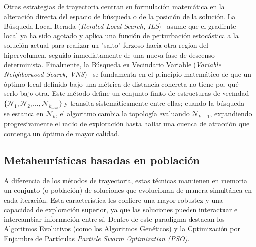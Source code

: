 \documentclass[12pt,a4paper,twoside,openright]{book}
\begin{document}
    Otras estrategias de trayectoria centran su formulación matemática en la alteración directa del espacio de búsqueda o de la posición de la solución. La Búsqueda Local Iterada (\textit{Iterated Local Search, ILS})~\cite{lourenco2003iterated} asume que el gradiente local ya ha sido agotado y aplica una función de perturbación estocástica a la solución actual para realizar un "salto" forzoso hacia otra región del hipervolumen, seguido inmediatamente de una nueva fase de descenso determinista. Finalmente, la Búsqueda en Vecindario Variable (\textit{Variable Neighborhood Search, VNS})~\cite{hansen2001variable} se fundamenta en el principio matemático de que un óptimo local definido bajo una métrica de distancia concreta no tiene por qué serlo bajo otra. Este método define un conjunto finito de estructuras de vecindad $\{\mathcal{N}_1, \mathcal{N}_2, \dots, \mathcal{N}_{k_{max}}\}$ y transita sistemáticamente entre ellas; cuando la búsqueda se estanca en $\mathcal{N}_k$, el algoritmo cambia la topología evaluando $\mathcal{N}_{k+1}$, expandiendo progresivamente el radio de exploración hasta hallar una cuenca de atracción que contenga un óptimo de mayor calidad.

\subsection{Metaheurísticas basadas en población}
    A diferencia de los métodos de trayectoria, estas técnicas mantienen en memoria un conjunto (o población) de soluciones que evolucionan de manera simultánea en cada iteración. Esta característica les confiere una mayor robustez y una capacidad de exploración superior, ya que las soluciones pueden interactuar e intercambiar información entre sí. Dentro de este paradigma destacan los Algoritmos Evolutivos (como los Algoritmos Genéticos) y la Optimización por Enjambre de Partículas \textit{Particle Swarm Optimization (PSO)}.
\end{document}
